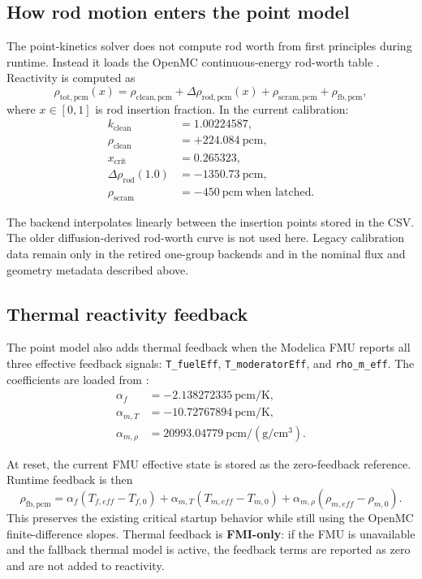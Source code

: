\documentclass[11pt]{article}
\begin{document}
\subsection{How rod motion enters the point model}

The point-kinetics solver does not compute rod worth from first principles during
runtime.  Instead it loads the OpenMC continuous-energy rod-worth table
.
Reactivity is computed as
\[
\rho_{\mathrm{tot,pcm}}(x)
= \rho_{\mathrm{clean,pcm}} + \Delta \rho_{\mathrm{rod,pcm}}(x)
+ \rho_{\mathrm{scram,pcm}} + \rho_{\mathrm{fb,pcm}},
\]
where $x \in [0,1]$ is rod insertion fraction.  In the current calibration:
\begin{align*}
k_{\mathrm{clean}} &= 1.00224587, \\
\rho_{\mathrm{clean}} &= +224.084\ \mathrm{pcm}, \\
x_{\mathrm{crit}} &= 0.265323, \\
\Delta \rho_{\mathrm{rod}}(1.0) &= -1350.73\ \mathrm{pcm}, \\
\rho_{\mathrm{scram}} &= -450\ \mathrm{pcm}\ \text{when latched.}
\end{align*}

The backend interpolates linearly between the insertion points stored in the
CSV.  The older diffusion-derived rod-worth curve is not used here.  Legacy
calibration data remain only in the retired one-group backends and in the
nominal flux and geometry metadata described above.

\subsection{Thermal reactivity feedback}

The point model also adds thermal feedback when the Modelica FMU reports all
three effective feedback signals:
\texttt{T\_fuelEff}, \texttt{T\_moderatorEff}, and \texttt{rho\_m\_eff}.  The
coefficients are loaded from
:
\begin{align*}
\alpha_f &= -2.138272335\ \mathrm{pcm/K}, \\
\alpha_{m,T} &= -10.72767894\ \mathrm{pcm/K}, \\
\alpha_{m,\rho} &= 20993.04779\ \mathrm{pcm/(g/cm^3)}.
\end{align*}

At reset, the current FMU effective state is stored as the zero-feedback
reference.  Runtime feedback is then
\[
\rho_{\mathrm{fb,pcm}} =
\alpha_f \left(T_{f,eff}-T_{f,0}\right)
+ \alpha_{m,T}\left(T_{m,eff}-T_{m,0}\right)
+ \alpha_{m,\rho}\left(\rho_{m,eff}-\rho_{m,0}\right).
\]
This preserves the existing critical startup behavior while still using the
OpenMC finite-difference slopes.  Thermal feedback is \textbf{FMI-only}: if the
FMU is unavailable and the fallback thermal model is active, the feedback terms
are reported as zero and are not added to reactivity.
\end{document}
